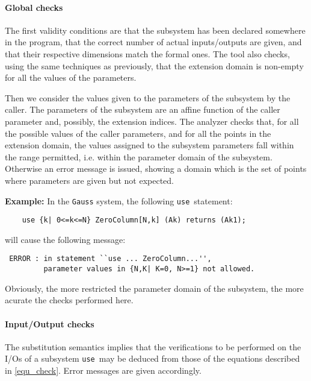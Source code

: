 \paragraph{Global checks}
The first validity conditions are that the subsystem has been declared
somewhere in the program, that the correct number of actual
inputs/outputs are given, and that their respective dimensions match
the formal ones.  The tool also checks, using the same techniques as
previously, that the extension domain is non-empty for all the values
of the parameters.

Then we consider the values given to the parameters of
the subsystem by the caller. The parameters of the subsystem are
an affine function of the caller parameter and,
possibly, the extension indices.  The analyzer checks that, for all
the possible values of the caller parameters, and for all the points
in the extension domain, the values assigned to the subsystem
parameters fall within the range permitted, i.e. within the parameter
domain of the subsystem.  Otherwise an error message is issued,
showing a domain which is the set of points where parameters are given
but not expected.


\textbf{Example:}
In the \texttt{Gauss} system, the following \texttt{use}\ statement:
\begin{verbatim}
    use {k| 0<=k<=N} ZeroColumn[N,k] (Ak) returns (Ak1);
\end{verbatim}
will cause the following message:
\begin{verbatim}
 ERROR : in statement ``use ... ZeroColumn...'',
         parameter values in {N,K| K=0, N>=1} not allowed.
\end{verbatim}
 
Obviously, the more restricted the parameter domain of the subsystem,
the more acurate the checks performed here.


\paragraph{Input/Output checks}

The substitution semantics implies that the verifications to be
performed on the I/Os of a subsystem \texttt{use}\ may be deduced from
those of the equations described in \ref{equ_check}. Error messages
are given accordingly.



